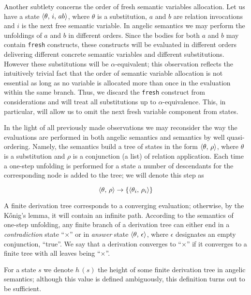 Another subtlety concerns the order of fresh semantic variables allocation. Let us have a state $\langle \theta,\,i,\,ab \rangle$, where
$\theta$ is a substitution, $a$ and $b$ are relation invocations and $i$ is the next free semantic variable. In angelic semantics we
may perform the unfoldings of $a$ and $b$ in different orders. Since the bodies for both $a$ and $b$ may contain \lstinline|fresh| constructs,
these constructs will be evaluated in different orders delivering different concrete semantic variables and different substitutions. However
these substitutions will be $\alpha$-equivalent; this observation reflects the intuitively trivial fact that the order of semantic variable
allocation is not essential as long as no variable is allocated more than once in the evaluation within the same branch. Thus, we discard
the \lstinline|fresh| construct from considerations and will treat all substitutions up to $\alpha$-equivalence. This, in particular,
will allow us to omit the next fresh variable component from states.

In the light of all previously made observations we may reconsider the way the evaluations are performed in both
angelic semantics and semantics by well quasi-ordering. Namely, the semantics build a tree of states in the form
$\langle \theta,\,\rho \rangle$, where $\theta$ is a substitution and $\rho$ is a conjunction (a list) of relation application.
Each time a one-step unfolding is performed for a state a number of descendants for the corresponding node is
added to the tree; we will denote this step as

\[
\langle \theta,\,\rho \rangle\to\{\langle \theta_i,\,\rho_i \rangle\}
\]

A finite derivation tree corresponds to a converging evaluation; otherwise, by the K\H{o}nig's lemma, it will contain an infinite path. 
According to the semantics of one-step unfolding, any finite branch of a derivation tree can either end in a \emph{contradiction} state ``$\times$''
or in \emph{answer} state $\langle \theta,\,\epsilon \rangle$, where $\epsilon$ designates an empty conjunction, ``true''. We say that a derivation
converges to ``$\times$'' if it converges to a finite tree with all leaves being ``$\times$''.

For a state $s$ we denote $h\,(s)$ the height of some finite derivation tree in angelic semantics; although this value is defined ambiguously, this
definition turns out to be sufficient.

